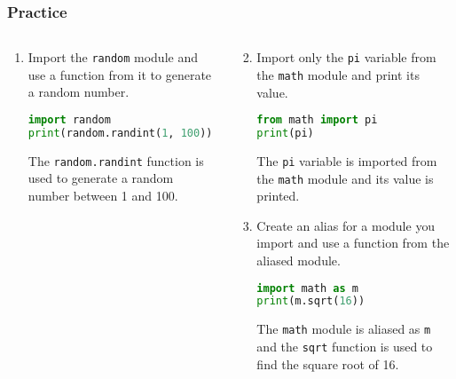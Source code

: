 \begin{frame}[fragile]
  \frametitle{Practice}
  \begin{columns}[T]

    \begin{column}{0.5\textwidth}
      \begin{enumerate}
        \item Import the \lstinline{random} module and use a function from it to generate a random number.\pause
        \begin{lstlisting}[language=Python, basicstyle=\scriptsize]
import random
print(random.randint(1, 100))
        \end{lstlisting}
        The \lstinline{random.randint} function is used to generate a random number between 1 and 100.\pause
      \end{enumerate}
    \end{column}

    \begin{column}{0.5\textwidth}
      \begin{enumerate}\setcounter{enumi}{1}
        \item Import only the \lstinline{pi} variable from the \lstinline{math} module and print its value.\pause
        \begin{lstlisting}[language=Python, basicstyle=\scriptsize]
from math import pi
print(pi)
        \end{lstlisting}
        The \lstinline{pi} variable is imported from the \lstinline{math} module and its value is printed.
        \item Create an alias for a module you import and use a function from the aliased module. \pause
        \begin{lstlisting}[language=Python, basicstyle=\scriptsize]
import math as m
print(m.sqrt(16))
        \end{lstlisting}
        The \lstinline{math} module is aliased as \lstinline{m} and the \lstinline{sqrt} function is used to find the square root of 16.
      \end{enumerate}
    \end{column}
  \end{columns}
\end{frame}


